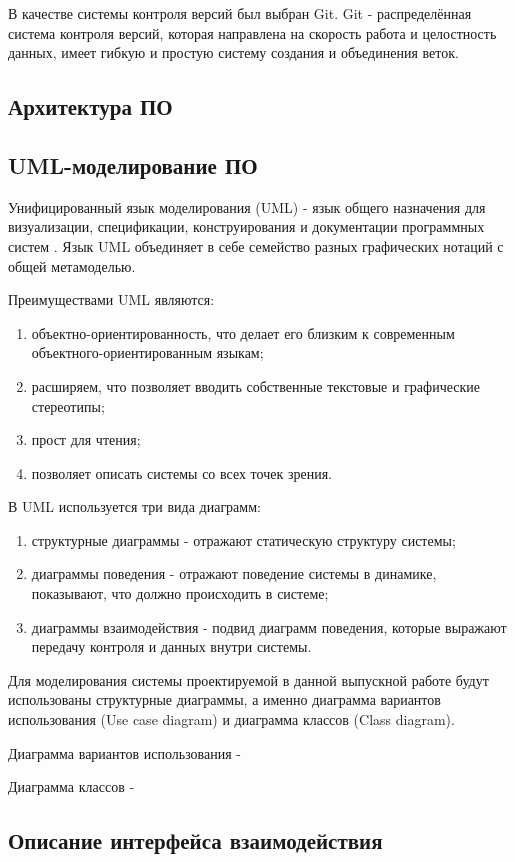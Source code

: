 В качестве системы контроля версий был выбран Git. Git - распределённая система контроля версий, которая направлена на скорость работа и целостность данных, имеет гибкую и простую систему создания и объединения веток.

\subsection{Архитектура ПО}



\subsection{UML-моделирование ПО}

Унифицированный язык моделирования (UML) - язык общего назначения для визуализации, спецификации, конструирования и документации программных систем \cite{UML_USER_GUIDE_2ND}. Язык UML объединяет в себе семейство разных графических нотаций с общей метамоделью. 

Преимуществами UML являются:

\begin{enumerate}
    \item объектно-ориентированность, что делает его близким к современным объектного-ориентированным языкам;
    \item расширяем, что позволяет вводить собственные текстовые и графические стереотипы;
    \item прост для чтения;
    \item позволяет описать системы со всех точек зрения.
\end{enumerate}

В UML используется три вида диаграмм:

\begin{enumerate}
    \item структурные диаграммы - отражают статическую структуру системы;
    \item диаграммы поведения - отражают поведение системы в динамике, показывают, что должно происходить в системе;
    \item диаграммы взаимодействия - подвид диаграмм поведения, которые выражают передачу контроля и данных внутри системы.
\end{enumerate} 

Для моделирования системы проектируемой в данной выпускной работе будут использованы структурные диаграммы, а именно диаграмма вариантов использования (Use case diagram) и диаграмма классов (Class diagram).

Диаграмма вариантов использования - 

Диаграмма классов - 


\subsection{Описание интерфейса взаимодействия}

